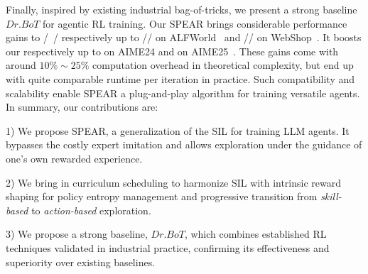 \documentclass[]{youtu} %
\newcommand{\method}{\textsc{SPEAR}\xspace}
\begin{document}
Finally, inspired by existing industrial bag-of-tricks, we present a strong baseline $\textit{Dr.BoT}$ { for agentic RL training.}
Our \method brings considerable performance gains to
{\color{turquoise}{GRPO}}/{\color{azure(colorwheel)}{GiGPO}}~\cite{feng2025group}/{} respectively up to {\color{turquoise}{16.1\%}}/{\color{azure(colorwheel)}{5.1\%}}/{\color{blue(ryb)}{8.6\%}} on ALFWorld~\cite{shridhar2020alfworld} and {\color{turquoise}{20.7\%}}/{\color{azure(colorwheel)}{11.8\%}}/{\color{blue(ryb)}{13.9\%}} on WebShop~\cite{yao2022webshop}.
It boosts our {} respectively up to {\color{blue(ryb)}{3.8\%}} on AIME24 and {\color{blue(ryb)}{6.1\%}} on AIME25~\cite{aime}.
These gains come with around $10\%\sim25\%$ computation overhead in theoretical complexity, but end up with quite comparable runtime per iteration in practice.
Such compatibility and scalability enable \method a plug-and-play algorithm for training versatile agents.
In summary, our contributions are:

{1)} We propose \method, a generalization of the SIL for training LLM agents.
It bypasses the costly expert imitation and allows exploration under the guidance of one's own rewarded experience.

{2)} We bring in curriculum scheduling to harmonize SIL with intrinsic reward shaping for policy entropy management and progressive transition from \textit{skill-based} to \textit{action-based} exploration.

{3)} We propose a strong baseline, $\textit{Dr.BoT}$, which combines established RL techniques validated in industrial practice, confirming its effectiveness and superiority over existing baselines.


\end{document}
